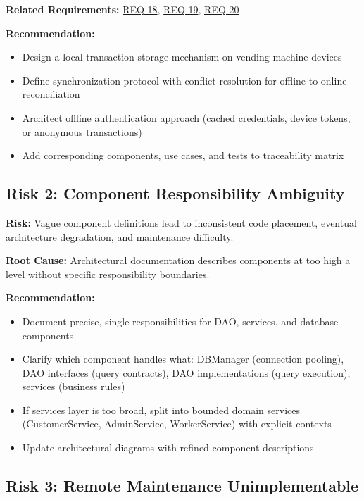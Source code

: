 \documentclass[11pt,a4paper]{article}
\begin{document}
\textbf{Related Requirements:} \hyperref[req:offline-tracking]{REQ-18}, \hyperref[req:offline-sync]{REQ-19}, \hyperref[req:offline-cash]{REQ-20}

\textbf{Recommendation:}
\begin{itemize}
    \item Design a local transaction storage mechanism on vending machine devices
    \item Define synchronization protocol with conflict resolution for offline-to-online reconciliation
    \item Architect offline authentication approach (cached credentials, device tokens, or anonymous transactions)
    \item Add corresponding components, use cases, and tests to traceability matrix
\end{itemize}

\subsection{Risk 2: Component Responsibility Ambiguity}

\textbf{Risk:} Vague component definitions lead to inconsistent code placement, eventual architecture degradation, and maintenance difficulty.

\textbf{Root Cause:} Architectural documentation describes components at too high a level without specific responsibility boundaries.

\textbf{Recommendation:}
\begin{itemize}
    \item Document precise, single responsibilities for DAO, services, and database components
    \item Clarify which component handles what: DBManager (connection pooling), DAO interfaces (query contracts), DAO implementations (query execution), services (business rules)
    \item If services layer is too broad, split into bounded domain services (CustomerService, AdminService, WorkerService) with explicit contexts
    \item Update architectural diagrams with refined component descriptions
\end{itemize}

\subsection{Risk 3: Remote Maintenance Unimplementable}
\label{risk:remote-maintenance}
\end{document}
